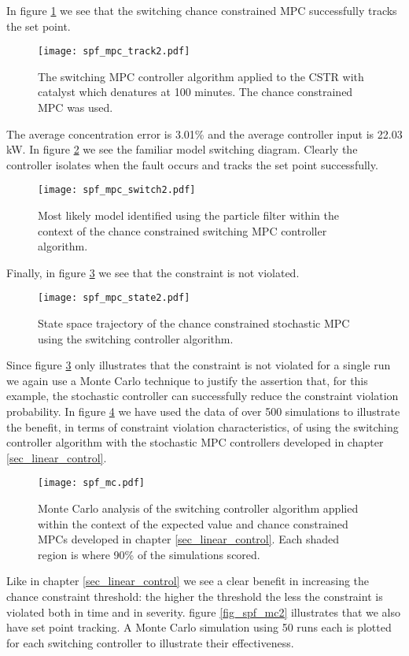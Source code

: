 In figure \ref{fig_spf_mpc_track2} we see that the switching chance constrained MPC successfully tracks the set point.
\begin{figure}[H] 
\centering
\texttt{[image: spf\_mpc\_track2.pdf]}
\caption{The switching MPC controller algorithm applied to the CSTR with catalyst which denatures at 100 minutes. The chance constrained MPC was used.}
\label{fig_spf_mpc_track2}
\end{figure}
The average concentration error is 3.01\% and the average controller input is 22.03 kW. In figure \ref{fig_spf_mpc_switch2} we see the familiar model switching diagram. Clearly the controller isolates when the fault occurs and tracks the set point successfully. 
\begin{figure}[H] 
\centering
\texttt{[image: spf\_mpc\_switch2.pdf]}
\caption{Most likely model identified using the particle filter within the context of the chance constrained switching MPC controller algorithm.}
\label{fig_spf_mpc_switch2}
\end{figure}
Finally, in figure \ref{fig_spf_mpc_state2} we see that the constraint is not violated.
\begin{figure}[H] 
\centering
\texttt{[image: spf\_mpc\_state2.pdf]}
\caption{State space trajectory of the chance constrained stochastic MPC using the switching controller algorithm.}
\label{fig_spf_mpc_state2}
\end{figure}
Since figure \ref{fig_spf_mpc_state2} only illustrates that the constraint is not violated for a single run we again use a Monte Carlo technique to justify the assertion that, for this example, the stochastic controller can successfully reduce the constraint violation probability. In figure \ref{fig_spf_mc} we have used the data of over 500 simulations to illustrate the benefit, in terms of constraint violation characteristics, of using the switching controller algorithm with the stochastic MPC controllers developed in chapter \ref{sec_linear_control}.
\begin{figure}[H] 
\centering
\texttt{[image: spf\_mc.pdf]}
\caption{Monte Carlo analysis of the switching controller algorithm applied within the context of the expected value and chance constrained MPCs developed in chapter \ref{sec_linear_control}. Each shaded region is where 90\% of the simulations scored.}
\label{fig_spf_mc}
\end{figure}
Like in chapter \ref{sec_linear_control} we see a clear benefit in increasing the chance constraint threshold: the higher the threshold the less the constraint is violated both in time and in severity. figure \ref{fig_spf_mc2} illustrates that we also have set point tracking. A Monte Carlo simulation using 50 runs each is plotted for each switching controller to illustrate their effectiveness.
